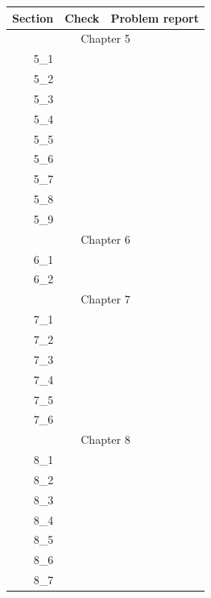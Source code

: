 \begin{tabular}{|r|r|p{8cm}|}
\hline
Section & Check & Problem report \\
\hline
\hline
\multicolumn{3}{|c|}{Chapter 5}\\
\hline
5\_1 & & \\
\hline
5\_2 & & \\
\hline
5\_3 & & \\
\hline
5\_4 & & \\
\hline
5\_5 & & \\
\hline
5\_6 & & \\
\hline
5\_7 & & \\
\hline
5\_8 & & \\
\hline
5\_9 & & \\
\hline
\hline
\multicolumn{3}{|c|}{Chapter 6}\\
\hline
6\_1 & & \\
\hline
6\_2 & & \\
\hline
\hline
\multicolumn{3}{|c|}{Chapter 7}\\
\hline
7\_1 & & \\
\hline
7\_2 & & \\
\hline
7\_3 & & \\
\hline
7\_4 & & \\
\hline
7\_5 & & \\
\hline
7\_6 & & \\
\hline
\hline
\multicolumn{3}{|c|}{Chapter 8}\\
\hline
8\_1 & & \\
\hline
8\_2 & & \\
\hline
8\_3 & & \\
\hline
8\_4 & & \\
\hline
8\_5 & & \\
\hline
8\_6 & & \\
\hline
8\_7 & & \\
\hline
\hline
\end{tabular}



